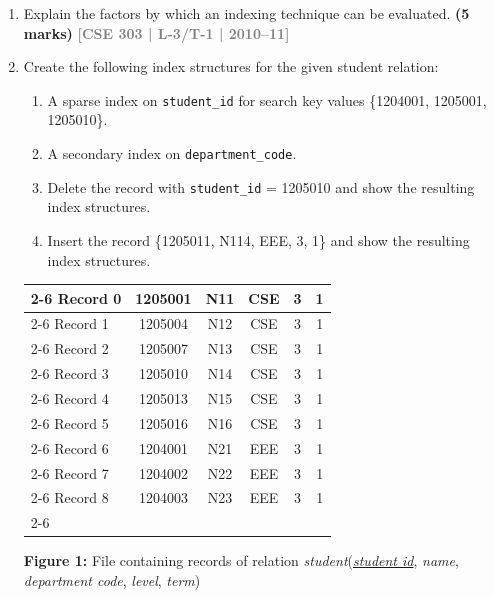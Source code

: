 \documentclass[12pt,a3paper]{article}
\newcommand{\yr}[1]{\hfill\textcolor{gray}{\small\textbf{[#1]}}}
\newcommand{\mk}[1]{\textcolor{orange!70!black}{\small\textbf{(#1 marks)}}}
\begin{document}
\begin{enumerate}

\item Explain the factors by which an indexing technique can be evaluated.
\mk{5} \yr{CSE 303 | L-3/T-1 | 2010--11}

\item Create the following index structures for the given student relation:
\begin{enumerate}
  \item A sparse index on \texttt{student\_id} for search key values \{1204001, 1205001, 1205010\}.
  \item A secondary index on \texttt{department\_code}.
  \item Delete the record with \texttt{student\_id} = 1205010 and show the resulting index structures.
  \item Insert the record \{1205011, N114, EEE, 3, 1\} and show the resulting index structures.
\end{enumerate}

\begin{center}
  
  \renewcommand{\arraystretch}{1.3} %
    \begin{tabular}{l |c|c|c|c|c|}
        \cline{2-6}
        Record 0 & 1205001 & N11 & CSE & 3 & 1 \\
        \cline{2-6}
        Record 1 & 1205004 & N12 & CSE & 3 & 1 \\
        \cline{2-6}
        Record 2 & 1205007 & N13 & CSE & 3 & 1 \\
        \cline{2-6}
        Record 3 & 1205010 & N14 & CSE & 3 & 1 \\
        \cline{2-6}
        Record 4 & 1205013 & N15 & CSE & 3 & 1 \\
        \cline{2-6}
        Record 5 & 1205016 & N16 & CSE & 3 & 1 \\
        \cline{2-6}
        Record 6 & 1204001 & N21 & EEE & 3 & 1 \\
        \cline{2-6}
        Record 7 & 1204002 & N22 & EEE & 3 & 1 \\
        \cline{2-6}
        Record 8 & 1204003 & N23 & EEE & 3 & 1 \\
        \cline{2-6}
    \end{tabular}
    
    \vspace{0.4cm}
    \textbf{Figure 1:} File containing records of relation \textit{student}(\underline{\textit{student id}}, \textit{name}, \textit{department code}, \textit{level}, \textit{term})


\end{center}
\end{enumerate}
\end{document}
